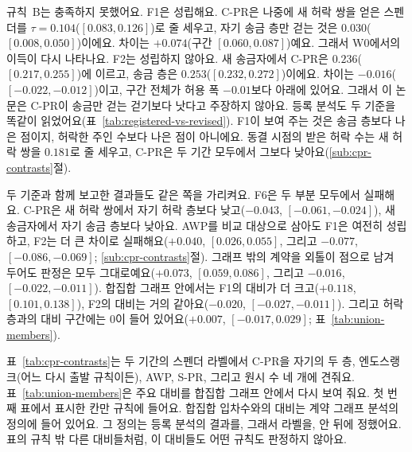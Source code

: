 



규칙~B는 충족하지 못했어요. F1은 성립해요. \mbox{C-PR}은 나중에 새 허락 쌍을 얻은 스펜더를 $\tau=0.104$($[0.083,0.126]$)로 줄 세우고, 자기 송금 층만 걷는 것은 $0.030$($[0.008,0.050]$)이에요. 차이는 $+0.074$(구간 $[0.060,0.087]$)예요. 그래서 W0에서의 이득이 다시 나타나요. F2는 성립하지 않아요. 새 송금자에서 \mbox{C-PR}은 $0.236$($[0.217,0.255]$)에 이르고, 송금 층은 $0.253$($[0.232,0.272]$)이에요. 차이는 $-0.016$($[-0.022,-0.012]$)이고, 구간 전체가 허용 폭 $-0.01$보다 아래에 있어요. 그래서 이 논문은 \mbox{C-PR}이 송금만 걷는 걷기보다 낫다고 주장하지 않아요. 등록 분석도 두 기준을 똑같이 읽었어요(표~\ref{tab:registered-vs-revised}). F1이 보여 주는 것은 송금 층보다 나은 점이지, 허락한 주인 수보다 나은 점이 아니에요. 동결 시점의 받은 허락 수는 새 허락 쌍을 $0.181$로 줄 세우고, \mbox{C-PR}은 두 기간 모두에서 그보다 낮아요(\ref{sub:cpr-contrasts}절).

두 기준과 함께 보고한 결과들도 같은 쪽을 가리켜요. F6은 두 부분 모두에서 실패해요. \mbox{C-PR}은 새 허락 쌍에서 자기 허락 층보다 낮고($-0.043$, $[-0.061,-0.024]$), 새 송금자에서 자기 송금 층보다 낮아요. AWP를 비교 대상으로 삼아도 F1은 여전히 성립하고, F2는 더 큰 차이로 실패해요($+0.040$, $[0.026,0.055]$, 그리고 $-0.077$, $[-0.086,-0.069]$; \ref{sub:cpr-contrasts}절). 그래프 밖의 계약을 외톨이 점으로 남겨 두어도 판정은 모두 그대로예요($+0.073$, $[0.059,0.086]$, 그리고 $-0.016$, $[-0.022,-0.011]$). 합집합 그래프 안에서는 F1의 대비가 더 크고($+0.118$, $[0.101,0.138]$), F2의 대비는 거의 같아요($-0.020$, $[-0.027,-0.011]$). 그리고 허락 층과의 대비 구간에는 0이 들어 있어요($+0.007$, $[-0.017,0.029]$; 표~\ref{tab:union-members}).


표~\ref{tab:cpr-contrasts}는 두 기간의 스펜더 라벨에서 \mbox{C-PR}을 자기의 두 층, 엔도스랭크(어느 다시 출발 규칙이든), AWP, \mbox{S-PR}, 그리고 원시 수 네 개에 견줘요. 표~\ref{tab:union-members}은 주요 대비를 합집합 그래프 안에서 다시 보여 줘요. 첫 번째 표에서 표시한 칸만 규칙에 들어요. 합집합 입차수와의 대비는 계약 그래프 분석의 정의에 들어 있어요. 그 정의는 등록 분석의 결과를, 그래서 라벨을, 안 뒤에 정했어요. 표의 규칙 밖 다른 대비들처럼, 이 대비들도 어떤 규칙도 판정하지 않아요.





